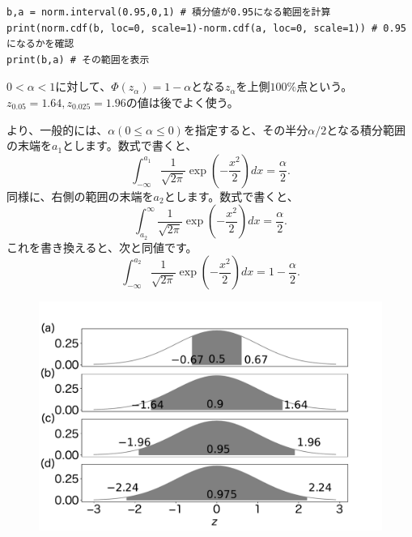 \begin{lstlisting}
b,a = norm.interval(0.95,0,1) # 積分値が0.95になる範囲を計算
print(norm.cdf(b, loc=0, scale=1)-norm.cdf(a, loc=0, scale=1)) # 0.95になるかを確認
print(b,a) # その範囲を表示
\end{lstlisting}


$0<\alpha<1$に対して、$\Phi(z_\alpha) = 1-\alpha$となる$z_\alpha$を上側$100\%$点という。
$z_{0.05}=1.64,z_{0.025}=1.96$の値は後でよく使う。

より、一般的には、$\alpha(0\leq \alpha \leq 0)$を指定すると、その半分$\alpha/2$となる積分範囲の末端を$a_1$とします。数式で書くと、
\begin{equation}
    \int_{-\infty}^{a_1} \frac{1}{\sqrt{2\pi}}\exp(-\frac{x^2}{2})dx = \frac{\alpha}{2}.
\end{equation}
同様に、右側の範囲の末端を$a_2$とします。数式で書くと、
\begin{equation*}
    \int_{a_2}^{\infty} \frac{1}{\sqrt{2\pi}}\exp(-\frac{x^2}{2})dx = \frac{\alpha}{2}.
\end{equation*}
これを書き換えると、次と同値です。
\begin{equation*}
    \int_{-\infty}^{a_2} \frac{1}{\sqrt{2\pi}}\exp(-\frac{x^2}{2})dx = 1-\frac{\alpha}{2}.
\end{equation*}

\begin{figure}
\begin{center}
    \includegraphics[width=15cm]{./image/02_/z_value.pdf}
  \end{center}
\end{figure}

